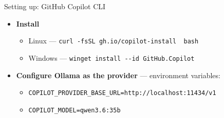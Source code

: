 \documentclass[aspectratio=169,10pt]{beamer}
\begin{document}
\begin{frame}[fragile]{Setting up: GitHub Copilot CLI}
  \begin{itemize}
    \item \textbf{Install}
      \begin{itemize}
        \item Linux --- \texttt{curl -fsSL gh.io/copilot-install \textbar\ bash}
        \item Windows --- \texttt{winget install -{}-id GitHub.Copilot}
      \end{itemize}
    \item \textbf{Configure Ollama as the provider} --- environment
      variables:
      \begin{itemize}
        \item \texttt{COPILOT\_PROVIDER\_BASE\_URL=http://localhost:11434/v1}
        \item \texttt{COPILOT\_MODEL=qwen3.6:35b}
      \end{itemize}
  \end{itemize}
\end{frame}
\end{document}
